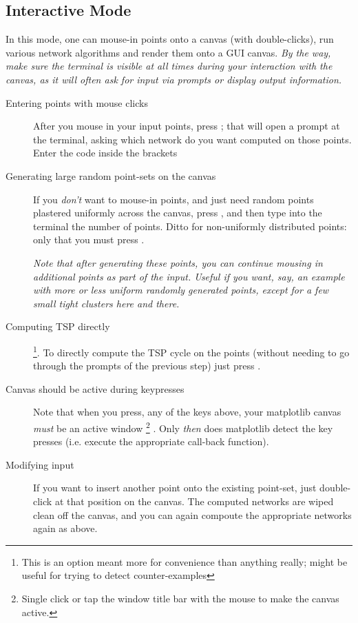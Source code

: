 \begin{appendices}
\subsection{Interactive Mode}


In this mode, one can mouse-in points onto a canvas (with double-clicks), run various network algorithms 
and render them onto a GUI canvas. \textit{\footnotesize By the way, make sure the terminal is visible at all times during your 
interaction with the canvas, as it will often ask for input via prompts or display output information.}


\begin{description}
\item[Entering points with mouse clicks] After you  mouse in your input points, press ; that will open a prompt at the terminal, asking which 
network do  you want computed on those points. Enter the code inside the brackets  

\item[Generating large random point-sets on the canvas] If you \textit{don't} want to mouse-in points, and just need random points plastered uniformly across the canvas, 
press , and then type into the terminal the number of points. Ditto for non-uniformly distributed points: 
only that you must press . 

  \textit{Note that after generating these points, you can continue mousing in additional points as part of the input. Useful 
  if you want, say, an example with more or less uniform randomly generated points, except for a few small tight clusters here and there. }

\item[Computing TSP directly] \footnote{This is an option meant more for convenience than anything really; might be useful for trying to detect counter-examples}.   
To directly compute the TSP cycle on the points (without needing to go through the prompts of the previous step) just press . 

\item[Canvas should be active during keypresses] Note that when you press, any of the keys above, your matplotlib canvas \textit{must} be an active window 
\footnote{Single click or tap the window title bar with the mouse to make the canvas active.} . Only \textit{then} 
does matplotlib detect the key presses (i.e. execute the appropriate call-back function).  

\item[Modifying input] If you want to insert another point onto the existing point-set, just double-click at that position on the canvas. 
The computed networks are wiped clean off the canvas, and you can again compoute the appropriate networks again as above. 


\end{description}
\end{appendices}
